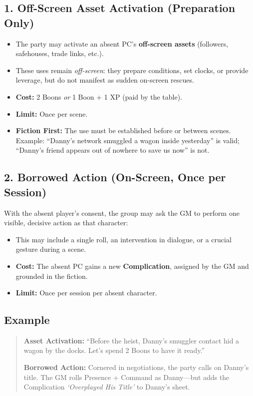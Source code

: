 \documentclass[12pt]{article}
\begin{document}
\subsection*{1. Off-Screen Asset Activation (Preparation Only)}
\begin{itemize}
  \item The party may activate an absent PC’s \textbf{off-screen assets} (followers, safehouses, trade links, etc.).
  \item These uses remain \emph{off-screen}: they prepare conditions, set clocks, or provide leverage, but do not manifest as sudden on-screen rescues.
  \item \textbf{Cost:} 2 Boons \emph{or} 1 Boon + 1 XP (paid by the table).
  \item \textbf{Limit:} Once per scene.
  \item \textbf{Fiction First:} The use must be established before or between scenes. Example: “Danny’s network smuggled a wagon inside yesterday” is valid; “Danny’s friend appears out of nowhere to save us now” is not.
\end{itemize}

\subsection*{2. Borrowed Action (On-Screen, Once per Session)}
With the absent player’s consent, the group may ask the GM to perform one visible, decisive action as that character:
\begin{itemize}
  \item This may include a single roll, an intervention in dialogue, or a crucial gesture during a scene.
  \item \textbf{Cost:} The absent PC gains a new \textbf{Complication}, assigned by the GM and grounded in the fiction.
  \item \textbf{Limit:} Once per session per absent character.
\end{itemize}

\subsection*{Example}
\begin{quote}
\textbf{Asset Activation:} “Before the heist, Danny’s smuggler contact hid a wagon by the docks. Let’s spend 2 Boons to have it ready.”  

\textbf{Borrowed Action:} Cornered in negotiations, the party calls on Danny’s title. The GM rolls Presence + Command as Danny—but adds the Complication \emph{‘Overplayed His Title’} to Danny’s sheet.
\end{quote}
\end{document}
